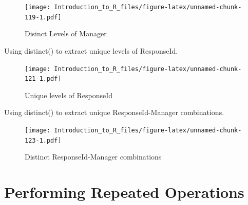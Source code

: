 \documentclass[]{book}
\newenvironment{Shaded}{\begin{snugshade}}{\end{snugshade}}
\newcommand{\KeywordTok}[1]{\textcolor[rgb]{0.13,0.29,0.53}{\textbf{#1}}}
\newcommand{\NormalTok}[1]{#1}
\newcommand{\OperatorTok}[1]{\textcolor[rgb]{0.81,0.36,0.00}{\textbf{#1}}}
\newcommand{\StringTok}[1]{\textcolor[rgb]{0.31,0.60,0.02}{#1}}
\theoremstyle{definition}
\theoremstyle{definition}
\theoremstyle{definition}
\theoremstyle{remark}
\let\BeginKnitrBlock\begin \let\EndKnitrBlock\end
\begin{document}
\begin{Shaded}
\end{Shaded}

\begin{figure}
\centering
\texttt{[image: Introduction\_to\_R\_files/figure-latex/unnamed-chunk-119-1.pdf]}
\caption{\label{fig:unnamed-chunk-119}Disinct Levels of Manager}
\end{figure}

\BeginKnitrBlock{example}
\protect\hypertarget{exm:distinct2}{}{\label{exm:distinct2} }Using distinct() to extract unique levels of ResponseId.
\EndKnitrBlock{example}

\begin{Shaded}
\end{Shaded}

\begin{figure}
\centering
\texttt{[image: Introduction\_to\_R\_files/figure-latex/unnamed-chunk-121-1.pdf]}
\caption{\label{fig:unnamed-chunk-121}Unique levels of ResponseId}
\end{figure}

\BeginKnitrBlock{example}
\protect\hypertarget{exm:distinct3}{}{\label{exm:distinct3} }Using distinct() to extract unique ResponseId-Manager combinations.
\EndKnitrBlock{example}

\begin{Shaded}
\end{Shaded}

\begin{figure}
\centering
\texttt{[image: Introduction\_to\_R\_files/figure-latex/unnamed-chunk-123-1.pdf]}
\caption{\label{fig:unnamed-chunk-123}Distinct ResponseId-Manager combinations}
\end{figure}

\hypertarget{performing-repeated-operations}{%
\chapter{Performing Repeated Operations}\label{performing-repeated-operations}}
\end{document}
